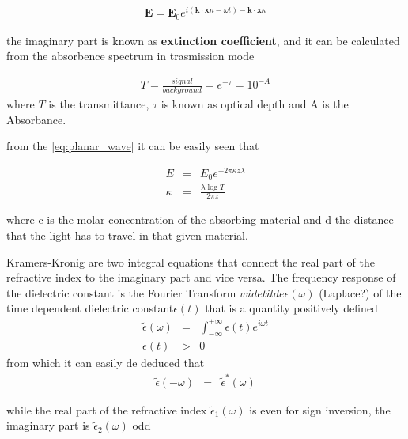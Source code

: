 \begin{eqnarray}\label{eq:planar_wave}
	\mathbf{E} = \mathbf{E}_0 e^{i (\mathbf{k}\cdot\mathbf{x}n -\omega t ) - \mathbf{k}\cdot\mathbf{x}\kappa }
\end{eqnarray}

the imaginary part is known as {\bf extinction coefficient}, and it can be calculated from the absorbence spectrum in trasmission mode



\begin{eqnarray}
	T = \frac{signal}{background} = e^{-\tau}= 10^{-A}
\end{eqnarray}
where $T$ is the transmittance, $\tau$ is known as optical depth and A is the Absorbance.

from the \ref{eq:planar_wave} it can be easily seen that 

\begin{eqnarray}
	E & = & E_0e^{-2\pi \kappa z \lambda}\\
	\kappa & = & \frac{\lambda\log{T} }{2\pi z}
\end{eqnarray}


where c  is the molar concentration of the absorbing material and d the distance that the light has to travel in that given material.




Kramers-Kronig are two integral equations that connect the real part of the refractive index to the imaginary part and vice versa. The frequency response of the dielectric constant is the Fourier Transform $widetilde{\epsilon}(\omega)$ (Laplace?) of the time dependent dielectric constant$\epsilon (t)$ that is a quantity positively defined
\begin{eqnarray}
	\widetilde{\epsilon}(\omega) & = & \int_{-\infty}^{+\infty}\epsilon (t)e^{i\omega t} \\
	\epsilon (t) & > & 0
\end{eqnarray}
from which it can easily de deduced that
\begin{eqnarray}
	\widetilde{\epsilon}(-\omega) & = & \widetilde{\epsilon}^*(\omega)
\end{eqnarray}

while the real part of the refractive index $\widetilde{\epsilon}_1(\omega)$ is even for sign inversion, the imaginary part is $\widetilde{\epsilon}_2(\omega)$ odd

